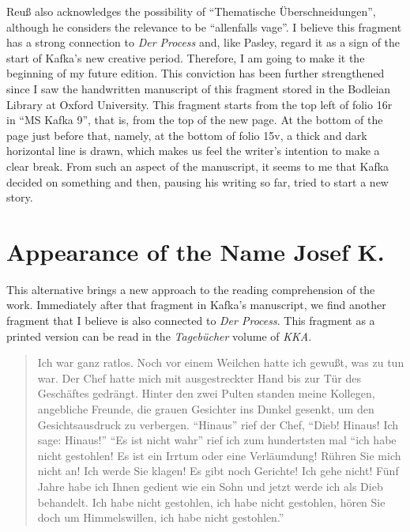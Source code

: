\begin{paper}
Reuß also acknowledges the possibility of ``Thematische
Überschneidungen'', although he considers the relevance to be
``allenfalls vage''. I believe this fragment has a strong connection to
\emph{Der Process} and, like Pasley, regard it as a sign of the start of
Kafka's new creative period. Therefore, I am going to make it the
beginning of my future edition. This conviction has been further
strengthened since I saw the handwritten manuscript of this fragment
stored in the Bodleian Library at Oxford University. This fragment
starts from the top left of folio 16r in ``MS Kafka 9'', that is, from
the top of the new page. At the bottom of the page just before that,
namely, at the bottom of folio 15v, a thick and dark horizontal line is
drawn, which makes us feel the writer's intention to make a clear break.
From such an aspect of the manuscript, it seems to me that Kafka decided
on something and then, pausing his writing so far, tried to
start a new story.

\section{Appearance of the Name Josef
K.}\label{appearance-of-the-name-josef-k.}

This alternative brings a new approach to the reading comprehension of
the work. Immediately after that fragment in Kafka's manuscript, we find
another fragment that I believe is also connected to \emph{Der Process}.
This fragment as a printed version can be read in the \emph{Tagebücher}
volume of \emph{KKA}.

\begin{quote}
Ich war ganz ratlos. Noch vor einem Weilchen hatte ich gewußt, was zu
tun war. Der Chef hatte mich mit ausgestreckter Hand bis zur Tür des
Geschäftes gedrängt. Hinter den zwei Pulten standen meine Kollegen,
angebliche Freunde, die grauen Gesichter ins Dunkel gesenkt, um den
Gesichtsausdruck zu verbergen. ``Hinaus'' rief der Chef, ``Dieb! Hinaus!
Ich sage: Hinaus!{}'' ``Es ist nicht wahr'' rief ich zum hundertsten mal
``ich habe nicht gestohlen! Es ist ein Irrtum oder eine Verläumdung!
Rühren Sie mich nicht an! Ich werde Sie klagen! Es gibt noch Gerichte!
Ich gehe nicht! Fünf Jahre habe ich Ihnen gedient wie ein Sohn und jetzt
werde ich als Dieb behandelt. Ich habe nicht gestohlen, ich habe nicht
gestohlen, hören Sie doch um Himmelswillen, ich habe nicht gestohlen.''

\begin{flushright}
    \parencite[667]{kafka_tagebucher_1990}
\end{flushright}


\end{quote}
\end{paper}
